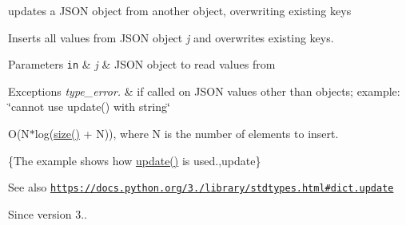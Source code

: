updates a J\+S\+ON object from another object, overwriting existing keys 

Inserts all values from J\+S\+ON object {\itshape j} and overwrites existing keys.


\begin{DoxyParams}[1]{Parameters}
\mbox{\tt in}  & {\em j} & J\+S\+ON object to read values from\\
\hline
\end{DoxyParams}

\begin{DoxyExceptions}{Exceptions}
{\em type\+\_\+error.} & if called on J\+S\+ON values other than objects; example\+: {\ttfamily \char`\"{}cannot use update() with string\char`\"{}}\\
\hline
\end{DoxyExceptions}
O(N$\ast$log(\hyperlink{classnlohmann_1_1basic__json_a25e27ad0c6d53c01871c5485e1f75b96}{size()} + N)), where N is the number of elements to insert.

\{The example shows how {\ttfamily \hyperlink{classnlohmann_1_1basic__json_a1cfa9ae5e7c2434cab4cfe69bffffe11}{update()}} is used.,update\}

\begin{DoxySeeAlso}{See also}
\href{https://docs.python.org/3.6/library/stdtypes.html#dict.update}{\tt https\+://docs.\+python.\+org/3./library/stdtypes.\+html\#dict.\+update}
\end{DoxySeeAlso}
\begin{DoxySince}{Since}
version 3.. 
\end{DoxySince}
